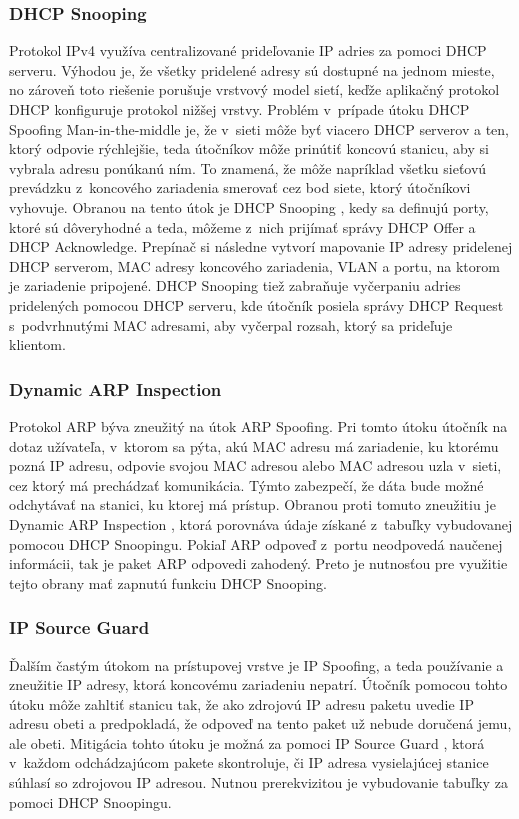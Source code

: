 \subsubsection{DHCP Snooping}
Protokol IPv4 využíva centralizované prideľovanie IP adries za pomoci DHCP serveru. Výhodou je, že všetky pridelené adresy sú dostupné na jednom mieste, no zároveň toto riešenie porušuje vrstvový model sietí, keďže aplikačný protokol DHCP konfiguruje protokol nižšej vrstvy. Problém v~prípade útoku DHCP Spoofing Man-in-the-middle je, že v~sieti môže byť viacero DHCP serverov a ten, ktorý odpovie rýchlejšie, teda útočníkov môže prinútiť koncovú stanicu, aby si vybrala adresu ponúkanú ním. To znamená, že môže napríklad všetku sieťovú prevádzku z~koncového zariadenia smerovať cez bod siete, ktorý útočníkovi vyhovuje. Obranou na tento útok je DHCP Snooping \cite{Vyncke2008}\cite{Singh2018}, kedy sa definujú porty, ktoré sú dôveryhodné a teda, môžeme z~nich prijímať správy DHCP Offer a DHCP Acknowledge. Prepínač si následne vytvorí mapovanie IP adresy pridelenej DHCP serverom, MAC adresy koncového zariadenia, VLAN a portu, na ktorom je zariadenie pripojené. 
\newpage
\noindent
DHCP Snooping tiež zabraňuje vyčerpaniu adries pridelených pomocou DHCP serveru, kde útočník posiela správy DHCP Request s~podvrhnutými MAC adresami, aby vyčerpal rozsah, ktorý sa prideľuje klientom.

\subsubsection{Dynamic ARP Inspection}
Protokol ARP býva zneužitý na útok ARP Spoofing. Pri tomto útoku útočník na dotaz užívateľa, v~ktorom sa pýta, akú MAC adresu má zariadenie, ku ktorému pozná IP adresu, odpovie svojou MAC adresou alebo MAC adresou uzla v~sieti, cez ktorý má prechádzať komunikácia. Týmto zabezpečí, že dáta bude možné odchytávať na stanici, ku ktorej má prístup. Obranou proti tomuto zneužitiu je Dynamic ARP Inspection \cite{McMillan2018}, ktorá porovnáva údaje získané z~tabuľky vybudovanej pomocou DHCP Snoopingu. Pokiaľ ARP odpoveď z~portu neodpovedá naučenej informácii, tak je paket ARP odpovedi zahodený. Preto je nutnosťou pre využitie tejto obrany mať zapnutú funkciu DHCP Snooping.

\subsubsection{IP Source Guard}
Ďalším častým útokom na prístupovej vrstve je IP Spoofing, a teda používanie a zneužitie IP adresy, ktorá koncovému zariadeniu nepatrí. Útočník pomocou tohto útoku môže zahltiť stanicu tak, že ako zdrojovú IP adresu paketu uvedie IP adresu obeti a predpokladá, že odpoveď na tento paket už nebude doručená jemu, ale obeti. Mitigácia tohto útoku je možná za pomoci IP Source Guard \cite{Singh2018}, ktorá v~každom odchádzajúcom pakete skontroluje, či IP adresa vysielajúcej stanice súhlasí so zdrojovou IP adresou. Nutnou prerekvizitou je vybudovanie tabuľky za pomoci DHCP Snoopingu.    

